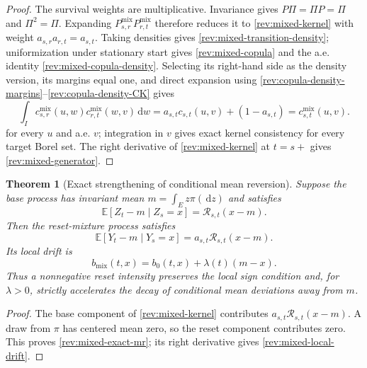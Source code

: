 \documentclass[11pt]{article}
\newtheorem{theorem}[definition]{Theorem}
\theoremstyle{remark}
\newcommand{\E}{\mathbb E}
\newcommand{\dd}{\,\mathrm d}
\begin{document}
\begin{proof}
The survival weights are multiplicative.  Invariance gives
$P\Pi=\Pi P=\Pi$ and $\Pi^2=\Pi$.  Expanding
$P^{\mathrm{mix}}_{s,r}P^{\mathrm{mix}}_{r,t}$ therefore reduces it to
\eqref{rev:mixed-kernel} with weight $a_{s,r}a_{r,t}=a_{s,t}$.
Taking densities gives \eqref{rev:mixed-transition-density}; uniformization
under stationary start gives \eqref{rev:mixed-copula} and
the a.e. identity \eqref{rev:mixed-copula-density}.  Selecting its right-hand
side as the density version, its margins equal one, and direct expansion
using \eqref{rev:copula-density-margins}--\eqref{rev:copula-density-CK} gives
\[
\int_Ic^{\mathrm{mix}}_{s,r}(u,w)c^{\mathrm{mix}}_{r,t}(w,v)\dd w
=a_{s,t}c_{s,t}(u,v)+(1-a_{s,t})
=c^{\mathrm{mix}}_{s,t}(u,v).
\]
for every $u$ and a.e. $v$; integration in $v$ gives exact kernel consistency
for every target Borel set.
The right derivative of \eqref{rev:mixed-kernel} at $t=s+$ gives
\eqref{rev:mixed-generator}.
\end{proof}

\begin{theorem}[Exact strengthening of conditional mean reversion]
\label{rev:thm-mixed-mr}
Suppose the base process has invariant mean
$m=\int_Ez\pi(\dd z)$ and satisfies
\begin{equation}
\E[Z_t-m\mid Z_s=x]=\mathcal R_{s,t}(x-m).
\label{rev:base-mr-for-mix}
\end{equation}
Then the reset-mixture process satisfies
\begin{equation}
\E[Y_t-m\mid Y_s=x]=a_{s,t}\mathcal R_{s,t}(x-m).
\label{rev:mixed-exact-mr}
\end{equation}
Its local drift is
\begin{equation}
b_{\mathrm{mix}}(t,x)=b_0(t,x)+\lambda(t)(m-x).
\label{rev:mixed-local-drift}
\end{equation}
Thus a nonnegative reset intensity preserves the local sign condition and, for
$\lambda>0$, strictly accelerates the decay of conditional mean deviations
away from $m$.
\end{theorem}

\begin{proof}
The base component of \eqref{rev:mixed-kernel} contributes
$a_{s,t}\mathcal R_{s,t}(x-m)$.  A draw from $\pi$ has centered mean zero, so the reset
component contributes zero.  This proves \eqref{rev:mixed-exact-mr}; its
right derivative gives \eqref{rev:mixed-local-drift}.
\end{proof}
\end{document}
